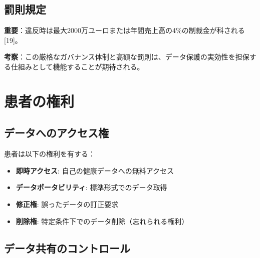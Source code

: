\documentclass[
  a4paper,
  a4paper,
  11pt]{ltjsbook}
\providecommand{\tightlist}{%
  \setlength{\itemsep}{0pt}\setlength{\parskip}{0pt}}
\begin{document}
\subsection{罰則規定}\label{ux7f70ux5247ux898fux5b9a}

\begin{tcolorbox}[enhanced jigsaw, toprule=.15mm, bottomtitle=1mm, coltitle=black, left=2mm, opacityback=0, arc=.35mm, colbacktitle=quarto-callout-warning-color!10!white, colback=white, opacitybacktitle=0.6, bottomrule=.15mm, rightrule=.15mm, breakable, title=\textcolor{quarto-callout-warning-color}{\faExclamationTriangle}\hspace{0.5em}{Warning}, toptitle=1mm, titlerule=0mm, colframe=quarto-callout-warning-color-frame, leftrule=.75mm]

\textbf{重要}：違反時は最大2000万ユーロまたは年間売上高の4\%の制裁金が科される{[}19{]}。

\end{tcolorbox}

\textbf{考察}：この厳格なガバナンス体制と高額な罰則は、データ保護の実効性を担保する仕組みとして機能することが期待される。

\section{患者の権利}\label{ux60a3ux8005ux306eux6a29ux5229}

\subsection{データへのアクセス権}\label{ux30c7ux30fcux30bfux3078ux306eux30a2ux30afux30bbux30b9ux6a29}

患者は以下の権利を有する：

\begin{itemize}
\tightlist
\item
  \textbf{即時アクセス}: 自己の健康データへの無料アクセス
\item
  \textbf{データポータビリティ}: 標準形式でのデータ取得
\item
  \textbf{修正権}: 誤ったデータの訂正要求
\item
  \textbf{削除権}: 特定条件下でのデータ削除（忘れられる権利）
\end{itemize}

\subsection{データ共有のコントロール}\label{ux30c7ux30fcux30bfux5171ux6709ux306eux30b3ux30f3ux30c8ux30edux30fcux30eb}
\end{document}
